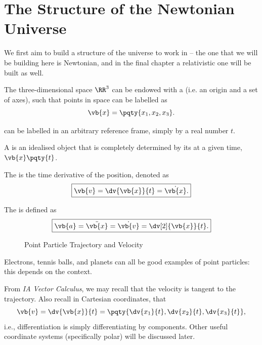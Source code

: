 \section{The Structure of the Newtonian Universe}

We first aim to build a structure of the universe to work in -- the one that we will be building here is Newtonian, and in the final chapter a relativistic one will be built as well.

\begin{definition}
    \label{def:newtonian-spacetime}
    The three-dimensional space \(\RR^3\) can be endowed with a  (i.e. an origin and a set of axes), such that points in space can be labelled as
    \begin{equation}
        \vb{x} = \pqty{x_1, x_2, x_3}.
    \end{equation}

     can be labelled in an arbitrary reference frame, simply by a real number \(t\).
\end{definition}

\begin{definition}
    \label{def:point-particle-position-velocity-acceleration}%
    A  is an idealised object that is completely determined by its  at a given time, \(\vb{x} \pqty{t}\).

    The  is the time derivative of the position, denoted as
    \begin{equation}
        \boxed{\vb{v} = \dv{\vb{x}}{t} = \dot{\vb{x}}.}
    \end{equation}

    The  is defined as
    \begin{equation}
        \boxed{\vb{a} = \ddot{\vb{x}} = \dot{\vb{v}} = \dv[2]{\vb{x}}{t}.}
    \end{equation}
\end{definition}

\begin{figure}[ht!]
    \centering
    \caption{Point Particle Trajectory and Velocity}
    \label{fig:point-particle-trajectory-velocity}%
\end{figure}

Electrons, tennis balls, and planets can all be good examples of point particles: this depends on the context.

From \textit{IA Vector Calculus}, we may recall that the velocity is tangent to the trajectory. Also recall in Cartesian coordinates, that
\begin{equation}
    \vb{v} = \dv{\vb{x}}{t} = \pqty{\dv{x_1}{t}, \dv{x_2}{t}, \dv{x_3}{t}},
\end{equation}
i.e., differentiation is simply differentiating by components. Other useful coordinate systems (specifically polar) will be discussed later.

